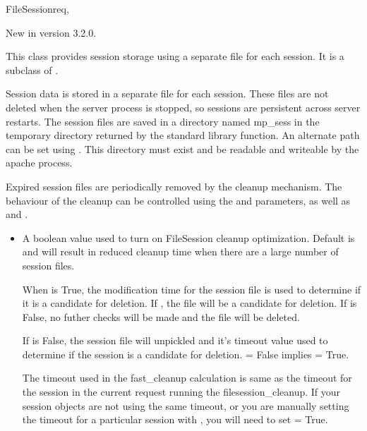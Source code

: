 \begin{classdesc}{FileSession}{req, }

  New in version 3.2.0.

  This class provides session storage using a separate file for each
  session. It is a subclass of .

  Session data is stored in a separate file for each session. These 
  files are not deleted when the server process is stopped, so
  sessions are persistent across server restarts.  
  The session files are saved in a directory named mp_sess in the 
  temporary directory returned by the  
  standard library function. An alternate path can be set using 
  . This
  directory must exist and be readable and writeable by the apache
  process.
  
  Expired session files are periodically removed by the cleanup
  mechanism. The behaviour of the cleanup can be controlled using the 
   and  parameters, as well as 
   and
  .

  \begin{itemize}
  \item
    A boolean value used to turn on FileSession cleanup optimization.
    Default is  and will result in reduced cleanup time when
    there are a large number of session files.
  
    When  is True, the modification time for the session
    file is used to determine if it is a candidate for deletion.
    If ,
    the file will be a candidate for deletion. If 
    is False, no futher checks will be made and the file will be
    deleted.
    
    If  is False, the session file will unpickled and
    it's timeout value used to determine if the session is a candidate for
    deletion.  = False implies  =
    True.

    The timeout used in the fast_cleanup calculation is same as the
    timeout for the session in the current request running the
    filesession_cleanup. If your session objects are not using the same
    timeout, or you are manually setting the timeout for a particular
    session with , you will need to set 
     = True.


\end{itemize}
\end{classdesc}
